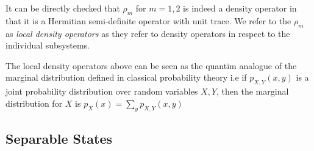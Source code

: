 \documentclass{../quantum.tex}
\begin{document}
It can be directly checked that $\rho_m$ for $m = 1,2$ is indeed a density operator in that it is a Hermitian semi-definite operator with unit trace. We refer to the $\rho_m$ as \textit{local density operators} as they refer to density operators in respect to the individual subsystems.

The local density operators above can be seen as the quantim analogue of the marginal distribution defined in classical probability theory i.e if $p_{X,Y}(x,y)$ is a joint probability distribution over random variables $X,Y$, then the marginal distribution for $X$ is
$p_X(x) = \sum_{y} p_{X,Y}(x,y)$


\subsection{Separable States}
\end{document}

